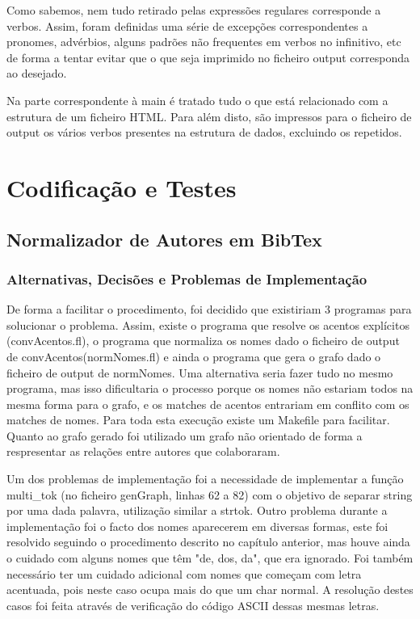 \documentclass{report}
\begin{document}
Como sabemos, nem tudo retirado pelas expressões regulares corresponde a verbos. 
Assim, foram definidas uma série de excepções correspondentes a pronomes, advérbios, 
alguns padrões não frequentes em verbos no infinitivo, etc de forma a tentar evitar 
que o que seja imprimido no ficheiro output corresponda ao desejado.

Na parte correspondente à main é tratado tudo o que está relacionado 
com a estrutura de um ficheiro HTML. Para além disto, são impressos para o 
ficheiro de output os vários verbos presentes na estrutura de dados, 
excluindo os repetidos.

\chapter{Codificação e Testes} \label{ct}

\section{Normalizador de Autores em BibTex}

\subsection{Alternativas, Decisões e Problemas de Implementação}
De forma a facilitar o procedimento, foi decidido que existiriam 3 programas para 
solucionar o problema. Assim, existe o programa que resolve os acentos explícitos
(convAcentos.fl), o programa que normaliza os nomes dado o ficheiro de output de 
convAcentos(normNomes.fl) e ainda o programa que gera o grafo dado o ficheiro de output 
de normNomes. Uma alternativa seria fazer tudo no mesmo programa, mas isso dificultaria 
o processo porque os nomes não estariam todos na mesma forma para o grafo, e os matches 
de acentos entrariam em conflito com os matches de nomes. Para toda esta execução existe 
um Makefile para facilitar.
Quanto ao grafo gerado foi utilizado um grafo não orientado de forma a respresentar 
as relações entre autores que colaboraram.\par
Um dos problemas de implementação foi a necessidade de implementar a função multi\_tok
(no ficheiro genGraph, linhas 62 a 82) com o objetivo de separar string por uma dada 
palavra, utilização similar a strtok. 
Outro problema durante a implementação foi o facto dos nomes aparecerem em diversas formas, 
este foi resolvido seguindo o procedimento descrito no capítulo anterior, mas houve ainda o 
cuidado com alguns nomes que têm "de, dos, da", que era ignorado. Foi também necessário ter 
um cuidado adicional com nomes que começam com letra acentuada, pois neste caso ocupa mais do 
que um char normal. A resolução destes casos foi feita através de verificação do 
código ASCII dessas mesmas letras.
\end{document}
